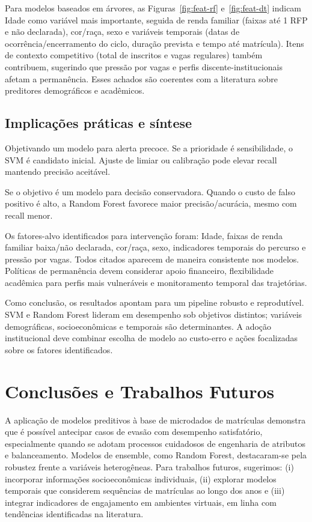 \documentclass[english, spanish, brazilian]{RBIEarticle} %
\begin{document}
Para modelos baseados em árvores, as Figuras~\ref{fig:feat-rf} e~\ref{fig:feat-dt} indicam Idade como variável mais importante, seguida de renda familiar (faixas até 1 RFP e não declarada), cor/raça, sexo e variáveis temporais (datas de ocorrência/encerramento do ciclo, duração prevista e tempo até matrícula). Itens de contexto competitivo (total de inscritos e vagas regulares) também contribuem, sugerindo que pressão por vagas e perfis discente-institucionais afetam a permanência. Esses achados são coerentes com a literatura sobre preditores demográficos e acadêmicos.


\subsection{Implicações práticas e síntese}

Objetivando um modelo para alerta precoce. Se a prioridade é sensibilidade, o SVM é candidato inicial. Ajuste de limiar ou calibração pode elevar recall mantendo precisão aceitável.

Se o objetivo é um modelo para decisão conservadora. Quando o custo de falso positivo é alto, a Random Forest favorece maior precisão/acurácia, mesmo com recall menor.

Os fatores-alvo identificados para intervenção foram: Idade, faixas de renda familiar baixa/não declarada, cor/raça, sexo, indicadores temporais do percurso e pressão por vagas. Todos citados aparecem de maneira consistente nos modelos. Políticas de permanência devem considerar apoio financeiro, flexibilidade acadêmica para perfis mais vulneráveis e monitoramento temporal das trajetórias.

Como conclusão, os resultados apontam para um pipeline robusto e reprodutível. SVM e Random Forest lideram em desempenho sob objetivos distintos; variáveis demográficas, socioeconômicas e temporais são determinantes. A adoção institucional deve combinar escolha de modelo ao custo-erro e ações focalizadas sobre os fatores identificados.

\section{Conclusões e Trabalhos Futuros}

A aplicação de modelos preditivos à base de microdados de matrículas demonstra que é possível antecipar casos de evasão com desempenho satisfatório, especialmente quando se adotam processos cuidadosos de engenharia de atributos e balanceamento. Modelos de ensemble, como Random Forest, destacaram-se pela robustez frente a variáveis heterogêneas. Para trabalhos futuros, sugerimos: (i) incorporar informações socioeconômicas individuais, (ii) explorar modelos temporais que considerem sequências de matrículas ao longo dos anos e (iii) integrar indicadores de engajamento em ambientes virtuais, em linha com tendências identificadas na literatura.
\end{document}
